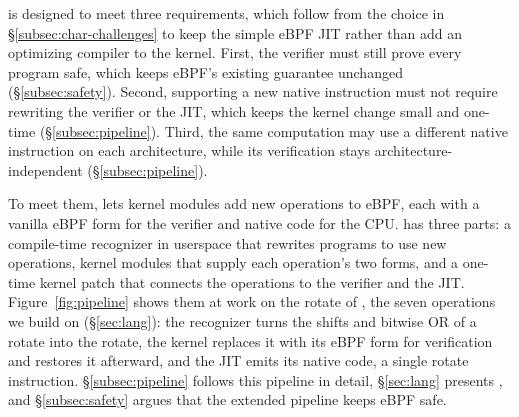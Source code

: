 \tool is designed to meet three requirements, which follow from the choice in \S\ref{subsec:char-challenges} to keep the simple eBPF JIT rather than add an optimizing compiler to the kernel.
First, the verifier must still prove every program safe, which keeps eBPF's existing guarantee unchanged (\S\ref{subsec:safety}).
Second, supporting a new native instruction must not require rewriting the verifier or the JIT, which keeps the kernel change small and one-time (\S\ref{subsec:pipeline}).
Third, the same computation may use a different native instruction on each architecture, while its verification stays architecture-independent (\S\ref{subsec:pipeline}).

To meet them, \tool lets kernel modules add new operations to eBPF, each with a vanilla eBPF form for the verifier and native code for the CPU.
\tool has three parts: a compile-time recognizer in userspace that rewrites programs to use new operations, kernel modules that supply each operation's two forms, and a one-time kernel patch that connects the operations to the verifier and the JIT.
Figure~\ref{fig:pipeline} shows them at work on the rotate of \lang, the seven operations we build on \tool (\S\ref{sec:lang}): the recognizer turns the shifts and bitwise OR of a rotate into the \lang rotate, the kernel replaces it with its eBPF form for verification and restores it afterward, and the JIT emits its native code, a single rotate instruction.
\S\ref{subsec:pipeline} follows this pipeline in detail, \S\ref{sec:lang} presents \lang, and \S\ref{subsec:safety} argues that the extended pipeline keeps eBPF safe.

